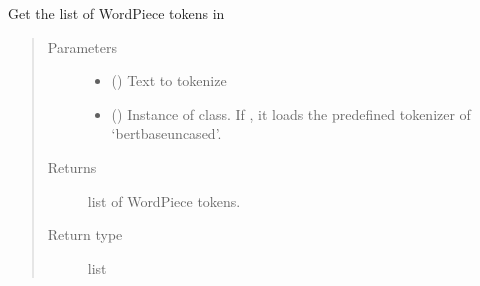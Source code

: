 \documentclass[letterpaper,10pt,english]{sphinxmanual}
\begin{document}
\begin{fulllineitems}
\label{\detokenize{code:code_utils.utils.get_tokenized_text}}
Get the list of WordPiece tokens in 
\begin{quote}\begin{description}
\item[{Parameters}] \leavevmode\begin{itemize}
\item {} 
 () \textendash{} Text to tokenize

\item {} 
 (\sphinxstyleliteralemphasis{\sphinxupquote{, }}) \textendash{} Instance of  class. If , it loads the
predefined tokenizer of ‘bert\sphinxhyphen{}base\sphinxhyphen{}uncased’.

\end{itemize}

\item[{Returns}] \leavevmode
list of WordPiece tokens.

\item[{Return type}] \leavevmode
list

\end{description}\end{quote}

\end{fulllineitems}

\end{document}
